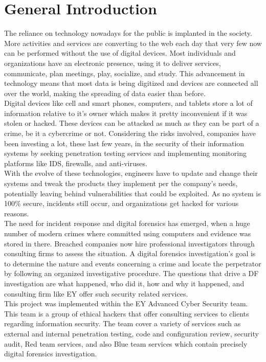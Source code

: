 \chapter*{General Introduction}
\label{Intro}
The reliance on technology nowadays for the public is implanted in the society. More activities and services are converting to the web each day that very few now can be performed without the use of digital devices. Most individuals and organizations have an electronic presence, using it to deliver services, communicate, plan meetings, play, socialize, and study. This advancement in technology means that most data is being digitized and devices are connected all over the world, making the spreading of data easier than before.\\
Digital devices like cell and smart phones, computers, and tablets store a lot of information relative to it's owner which makes it pretty inconvenient if it was stolen or hacked. These devices can be attacked as much as they can be part of a crime, be it a cybercrime or not. Considering the risks involved, companies have been investing a lot, these last few years, in the security of their information systems by seeking penetration testing services and implementing monitoring platforms like IDS, firewalls, and anti-viruses.\\
With the evolve of these technologies, engineers have to update and change their systems and tweak the products they implement per the company's needs, potentially leaving behind vulnerabilities that could be exploited. As no system is 100\% secure, incidents still occur, and organizations get hacked for various reasons.\\
The need for incident response and digital forensics has emerged, when a huge number of modern crimes where committed using computers and evidence was stored in there. Breached companies now hire professional investigators through consulting firms to assess the situation. A digital forensics investigation's goal is to determine the nature and events concerning a crime and locate the perpetrator by following an organized investigative procedure. The questions that drive a DF investigation are what happened, who did it, how and why it happened, and consulting firm like EY offer such security related services.\\
This project was implemented within the EY Advanced Cyber Security team. This team is a group of ethical hackers that offer consulting services to clients regarding information security. The team cover a variety of services such as external and internal penetration testing, code and configuration review, security audit, Red team services, and also Blue team services which contain precisely digital forensics investigation.\\
